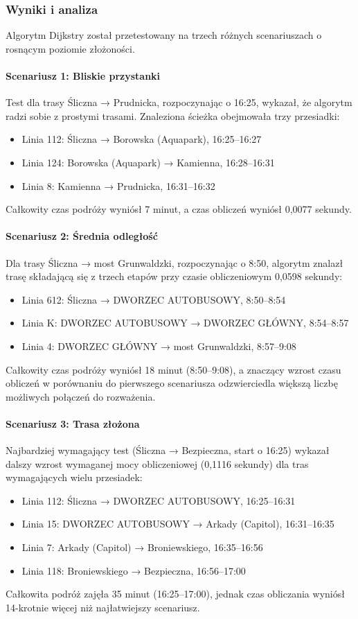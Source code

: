 \documentclass[12pt,a4paper]{article}
\begin{document}
\subsubsection{Wyniki i analiza}
Algorytm Dijkstry został przetestowany na trzech różnych scenariuszach o rosnącym poziomie złożoności.

\paragraph{Scenariusz 1: Bliskie przystanki} 
Test dla trasy Śliczna → Prudnicka, rozpoczynając o 16:25, wykazał, że algorytm radzi sobie z prostymi trasami. Znaleziona ścieżka obejmowała trzy przesiadki:
\begin{itemize}
    \item Linia 112: Śliczna → Borowska (Aquapark), 16:25--16:27
    \item Linia 124: Borowska (Aquapark) → Kamienna, 16:28--16:31
    \item Linia 8: Kamienna → Prudnicka, 16:31--16:32
\end{itemize}
Całkowity czas podróży wyniósł 7 minut, a czas obliczeń wyniósł 0,0077 sekundy.

\paragraph{Scenariusz 2: Średnia odległość}
Dla trasy Śliczna → most Grunwaldzki, rozpoczynając o 8:50, algorytm znalazł trasę składającą się z trzech etapów przy czasie obliczeniowym 0,0598 sekundy:
\begin{itemize}
    \item Linia 612: Śliczna → DWORZEC AUTOBUSOWY, 8:50--8:54
    \item Linia K: DWORZEC AUTOBUSOWY → DWORZEC GŁÓWNY, 8:54--8:57
    \item Linia 4: DWORZEC GŁÓWNY → most Grunwaldzki, 8:57--9:08
\end{itemize}
Całkowity czas podróży wyniósł 18 minut (8:50--9:08), a znaczący wzrost czasu obliczeń w porównaniu do pierwszego scenariusza odzwierciedla większą liczbę możliwych połączeń do rozważenia.

\paragraph{Scenariusz 3: Trasa złożona}
Najbardziej wymagający test (Śliczna → Bezpieczna, start o 16:25) wykazał dalszy wzrost wymaganej mocy obliczeniowej (0,1116 sekundy) dla tras wymagających wielu przesiadek:
\begin{itemize}
    \item Linia 112: Śliczna → DWORZEC AUTOBUSOWY, 16:25--16:31
    \item Linia 15: DWORZEC AUTOBUSOWY → Arkady (Capitol), 16:31--16:35
    \item Linia 7: Arkady (Capitol) → Broniewskiego, 16:35--16:56
    \item Linia 118: Broniewskiego → Bezpieczna, 16:56--17:00
\end{itemize}
Całkowita podróż zajęła 35 minut (16:25--17:00), jednak czas obliczania wyniósł 14-krotnie więcej niż najłatwiejszy scenariusz.
\end{document}

